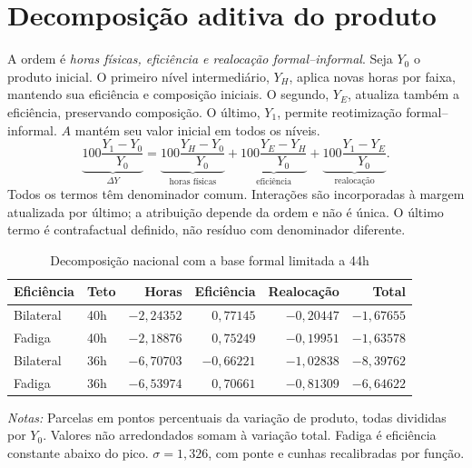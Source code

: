 \FloatBarrier
\section{Decomposição aditiva do produto}\label{app:decomposition}
A ordem é \emph{horas físicas, eficiência e realocação formal--informal}. Seja $Y_0$ o produto inicial. O primeiro nível intermediário, $Y_H$, aplica novas horas por faixa, mantendo sua eficiência e composição iniciais. O segundo, $Y_E$, atualiza também a eficiência, preservando composição. O último, $Y_1$, permite reotimização formal--informal. $A$ mantém seu valor inicial em todos os níveis.
\begin{equation}\label{eq:app_decomposition}
\underbrace{100\frac{Y_1-Y_0}{Y_0}}_{\Delta Y}
=\underbrace{100\frac{Y_H-Y_0}{Y_0}}_{\text{horas físicas}}
+\underbrace{100\frac{Y_E-Y_H}{Y_0}}_{\text{eficiência}}
+\underbrace{100\frac{Y_1-Y_E}{Y_0}}_{\text{realocação}}.
\end{equation}
Todos os termos têm denominador comum. Interações são incorporadas à margem atualizada por último; a atribuição depende da ordem e não é única. O último termo é contrafactual definido, não resíduo com denominador diferente.
\begin{table}[htbp]
\centering
\caption{Decomposição nacional com a base formal limitada a 44h}
\label{tab:app_decomposition}
\normalsize
\begin{tabular}{@{}llrrrr@{}}
\toprule
Eficiência & Teto & Horas & Eficiência & Realocação & Total \\
\midrule
Bilateral & 40h & $-2{,}24352$ & $0{,}77145$ & $-0{,}20447$ & $-1{,}67655$ \\
Fadiga & 40h & $-2{,}18876$ & $0{,}75249$ & $-0{,}19951$ & $-1{,}63578$ \\
Bilateral & 36h & $-6{,}70703$ & $-0{,}66221$ & $-1{,}02838$ & $-8{,}39762$ \\
Fadiga & 36h & $-6{,}53974$ & $0{,}70661$ & $-0{,}81309$ & $-6{,}64622$ \\
\bottomrule
\end{tabular}
\begin{minipage}{0.96\textwidth}\normalsize
\textit{Notas:} Parcelas em pontos percentuais da variação de produto, todas divididas por $Y_0$. Valores não arredondados somam à variação total. Fadiga é eficiência constante abaixo do pico. $\sigma=1{,}326$, com ponte e cunhas recalibradas por função.
\end{minipage}
\end{table}

